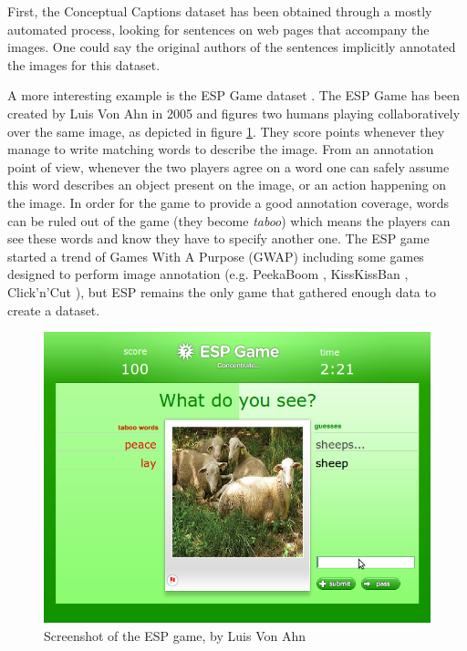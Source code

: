 First, the Conceptual Captions dataset \cite{sharma-etal-2018-conceptual} has been obtained through a mostly automated process, looking for sentences on web pages that accompany the images. One could say the original authors of the sentences implicitly annotated the images for this dataset. 


A more interesting example is the ESP Game dataset \cite{von2005esp}. The ESP Game has been created by Luis Von Ahn in 2005 and figures two humans playing collaboratively over the same image, as depicted in figure \ref{fig:esp}. They score points whenever they manage to write matching words to describe the image. From an annotation point of view, whenever the two players agree on a word one can safely assume this word describes an object present on the image, or an action happening on the image. In order for the game to provide a good annotation coverage, words can be ruled out of the game (they become \textit{taboo}) which means the players can see these words and know they have to specify another one. The ESP game started a trend of Games With A Purpose (GWAP) \cite{von2008designing} including some games designed to perform image annotation (e.g. PeekaBoom \cite{von2006peekaboom}, KissKissBan \cite{ho2010kisskissban}, Click'n'Cut \cite{carlier2014click}), but ESP remains the only game that gathered enough data to create a dataset. 

\begin{figure}[ht]
\centering
\includegraphics[width=0.5\columnwidth]{assets/img/esp.png}
\caption{Screenshot of the ESP game, by Luis Von Ahn \cite{von2005esp}}%
\label{fig:esp}
\end{figure}


